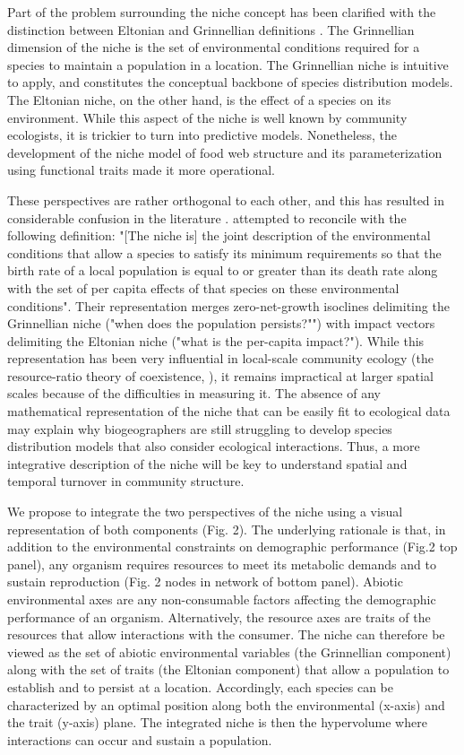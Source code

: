 \documentclass[12pt]{article}
\begin{document}
Part of the problem surrounding the niche concept has been clarified with the
distinction between Eltonian and Grinnellian definitions \citep{Chase2003}.
The Grinnellian dimension of the niche is the set of environmental conditions
required for a species to maintain a population in a location. The Grinnellian
niche is intuitive to apply, and constitutes the conceptual backbone of
species distribution models. The Eltonian niche, on the other hand, is the
effect of a species on its environment. While this aspect of the niche is well
known by community ecologists, it is trickier to turn into predictive models.
Nonetheless, the development of the niche model of food web structure
\citep{Williams2000} and its parameterization using functional traits
\citep{Gravel2013; Bartomeus2016} made it more operational.

These perspectives are rather orthogonal to each other, and this has resulted
in considerable confusion in the literature \citep{McInerny2012a}.
\citealt{Chase2003} attempted to reconcile with the following definition:
"[The niche is] the joint description of the environmental conditions that
allow a species to satisfy its minimum requirements so that the birth rate of
a local population is equal to or greater than its death rate along with the
set of per capita effects of that species on these environmental conditions".
Their representation merges zero-net-growth isoclines delimiting the
Grinnellian niche ("when does the population persists?"") with impact vectors
delimiting the Eltonian niche ("what is the per-capita impact?"). While this
representation has been very influential in local-scale community ecology (the
resource-ratio theory of coexistence, \citealt{Tilman1982}), it remains
impractical at larger spatial scales because of the difficulties in measuring
it. The absence of any mathematical representation of the niche that can be
easily fit to ecological data may explain why biogeographers are still
struggling to develop species distribution models that also consider
ecological interactions. Thus, a more integrative description of the niche
will be key to understand spatial and temporal turnover in community
structure.

We propose to integrate the two perspectives of the niche using a visual
representation of both components (Fig. 2). The underlying rationale is that,
in addition to the environmental constraints on demographic performance (Fig.2
top panel), any organism requires resources to meet its metabolic demands and
to sustain reproduction (Fig. 2 nodes in network of bottom panel). Abiotic
environmental axes are any non-consumable factors affecting the demographic
performance of an organism. Alternatively, the resource axes are traits of the
resources that allow interactions with the consumer. The niche can therefore
be viewed as the set of abiotic environmental variables (the Grinnellian
component) along with the set of traits (the Eltonian component) that allow a
population to establish and to persist at a location. Accordingly, each
species can be characterized by an optimal position along both the
environmental (x-axis) and the trait (y-axis) plane. The integrated niche is
then the hypervolume where interactions can occur and sustain a population.
\end{document}
